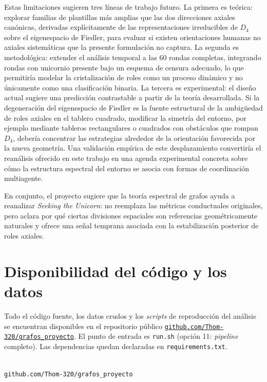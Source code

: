 \documentclass[journal]{IEEEtran}
\begin{document}
Estas limitaciones sugieren tres líneas de trabajo futuro. La primera es teórica: explorar familias de plantillas más amplias que las dos direcciones axiales canónicas, derivadas explícitamente de las representaciones irreducibles de $D_4$ sobre el eigenespacio de Fiedler, para evaluar si existen orientaciones humanas no axiales sistemáticas que la presente formulación no captura. La segunda es metodológica: extender el análisis temporal a las 60 rondas completas, integrando rondas con unicornio presente bajo un esquema de censura adecuado, lo que permitiría modelar la cristalización de roles como un proceso dinámico y no únicamente como una clasificación binaria. La tercera es experimental: el diseño actual sugiere una predicción contrastable a partir de la teoría desarrollada. Si la degeneración del eigenespacio de Fiedler es la fuente estructural de la ambigüedad de roles axiales en el tablero cuadrado, modificar la simetría del entorno, por ejemplo mediante tableros rectangulares o cuadrados con obstáculos que rompan $D_4$, debería concentrar las estrategias alrededor de la orientación favorecida por la nueva geometría. Una validación empírica de este desplazamiento convertiría el reanálisis ofrecido en este trabajo en una agenda experimental concreta sobre cómo la estructura espectral del entorno se asocia con formas de coordinación multiagente.

En conjunto, el proyecto sugiere que la teoría espectral de grafos ayuda a reanalizar \emph{Seeking the Unicorn}: no reemplaza las métricas conductuales originales, pero aclara por qué ciertas divisiones espaciales son referencias geométricamente naturales y ofrece una señal temprana asociada con la estabilización posterior de roles axiales.

\section*{Disponibilidad del código y los datos}

Todo el código fuente, los datos crudos y los \emph{scripts} de reproducción del análisis se encuentran disponibles en el repositorio público
\href{https://github.com/Thom-320/grafos_proyecto}{\texttt{github.com/Thom-320/grafos\_proyecto}}.
El punto de entrada es \texttt{run.sh} (opción 11: \emph{pipeline} completo). Las dependencias quedan declaradas en \texttt{requirements.txt}.

\begin{center}
\\[0.4em]
{\footnotesize\texttt{github.com/Thom-320/grafos\_proyecto}}
\end{center}
\end{document}
